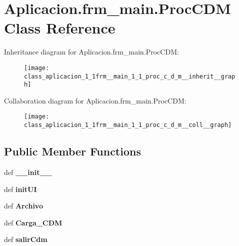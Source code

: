 \section{\-Aplicacion.\-frm\-\_\-main.\-Proc\-C\-D\-M \-Class \-Reference}
\label{class_aplicacion_1_1frm__main_1_1_proc_c_d_m}


\-Inheritance diagram for \-Aplicacion.\-frm\-\_\-main.\-Proc\-C\-D\-M\-:\nopagebreak
\begin{figure}[H]
\begin{center}
\leavevmode
\texttt{[image: class\_aplicacion\_1\_1frm\_\_main\_1\_1\_proc\_c\_d\_m\_\_inherit\_\_graph]}
\end{center}
\end{figure}


\-Collaboration diagram for \-Aplicacion.\-frm\-\_\-main.\-Proc\-C\-D\-M\-:\nopagebreak
\begin{figure}[H]
\begin{center}
\leavevmode
\texttt{[image: class\_aplicacion\_1\_1frm\_\_main\_1\_1\_proc\_c\_d\_m\_\_coll\_\_graph]}
\end{center}
\end{figure}
\subsection*{\-Public \-Member \-Functions}
\begin{DoxyCompactItemize}
\item 
def {\bf \-\_\-\-\_\-init\-\_\-\-\_\-}
\item 
def {\bf init\-U\-I}
\item 
def {\bf \-Archivo}
\item 
def {\bf \-Carga\-\_\-\-C\-D\-M}
\item 
def {\bf salir\-Cdm}
\end{DoxyCompactItemize}
